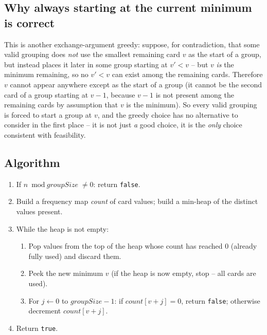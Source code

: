 \subsection*{Why always starting at the current minimum is correct}

This is another exchange-argument greedy: suppose, for contradiction, that
some valid grouping does \emph{not} use the smallest remaining card $v$ as
the start of a group, but instead places it later in some group starting
at $v' < v$ -- but $v$ \emph{is} the minimum remaining, so no $v' < v$ can
exist among the remaining cards. Therefore $v$ cannot appear anywhere
except as the start of a group (it cannot be the second card of a group
starting at $v-1$, because $v-1$ is not present among the remaining
cards by assumption that $v$ is the minimum). So every valid grouping is
forced to start a group at $v$, and the greedy choice has no alternative
to consider in the first place -- it is not just \emph{a} good choice, it
is the \emph{only} choice consistent with feasibility.

\subsection*{Algorithm}

\begin{enumerate}
  \item If $n \bmod \textit{groupSize} \ne 0$: return \texttt{false}.
  \item Build a frequency map \textit{count} of card values; build a
        min-heap of the distinct values present.
  \item While the heap is not empty:
  \begin{enumerate}
    \item Pop values from the top of the heap whose count has reached
          $0$ (already fully used) and discard them.
    \item Peek the new minimum $v$ (if the heap is now empty, stop --
          all cards are used).
    \item For $j \gets 0$ to $\textit{groupSize}-1$: if
          $\textit{count}[v+j] = 0$, return \texttt{false}; otherwise
          decrement $\textit{count}[v+j]$.
  \end{enumerate}
  \item Return \texttt{true}.
\end{enumerate}

